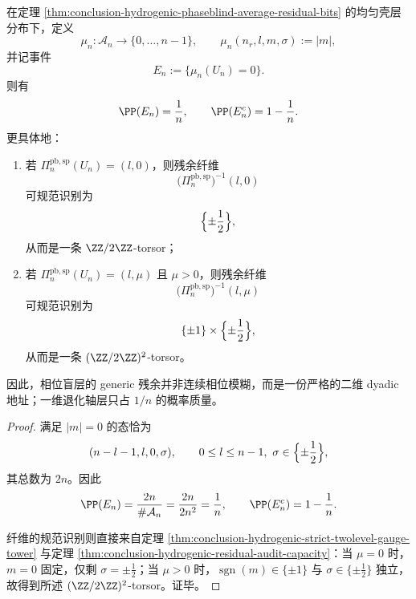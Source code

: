 \begin{theorem}\label{thm:conclusion-hydrogenic-generic-phaseblind-dyadic-torsor}
在定理 \ref{thm:conclusion-hydrogenic-phaseblind-average-residual-bits} 的均匀壳层分布下，定义
\[
\mu_n:\mathcal A_n\to \{0,\dots,n-1\},
\qquad
\mu_n(n_r,l,m,\sigma):=|m|,
\]
并记事件
\[
E_n:=\{\mu_n(U_n)=0\}.
\]
则有
\[
\PP(E_n)=\frac1n,
\qquad
\PP(E_n^c)=1-\frac1n.
\]
更具体地：
\begin{enumerate}
  \item 若 \(\Pi_n^{\mathrm{pb,sp}}(U_n)=(l,0)\)，则残余纤维
  \[
  \bigl(\Pi_n^{\mathrm{pb,sp}}\bigr)^{-1}(l,0)
  \]
  可规范识别为
  \[
  \Bigl\{\pm \frac12\Bigr\},
  \]
  从而是一条 \(\ZZ/2\ZZ\)-torsor；
  \item 若 \(\Pi_n^{\mathrm{pb,sp}}(U_n)=(l,\mu)\) 且 \(\mu>0\)，则残余纤维
  \[
  \bigl(\Pi_n^{\mathrm{pb,sp}}\bigr)^{-1}(l,\mu)
  \]
  可规范识别为
  \[
  \{\pm1\}\times \Bigl\{\pm\frac12\Bigr\},
  \]
  从而是一条 \((\ZZ/2\ZZ)^2\)-torsor。
\end{enumerate}
因此，相位盲层的 generic 残余并非连续相位模糊，而是一份严格的二维 dyadic 地址；一维退化轴层只占 \(1/n\) 的概率质量。
\end{theorem}
\begin{proof}
满足 \(|m|=0\) 的态恰为
\[
(n-l-1,l,0,\sigma),
\qquad
0\le l\le n-1,\ \sigma\in\Bigl\{\pm\frac12\Bigr\},
\]
其总数为 \(2n\)。因此
\[
\PP(E_n)=\frac{2n}{\#\mathcal A_n}=\frac{2n}{2n^2}=\frac1n,
\qquad
\PP(E_n^c)=1-\frac1n.
\]

纤维的规范识别则直接来自定理 \ref{thm:conclusion-hydrogenic-strict-twolevel-gauge-tower} 与定理 \ref{thm:conclusion-hydrogenic-residual-audit-capacity}：当 \(\mu=0\) 时，\(m=0\) 固定，仅剩 \(\sigma=\pm\tfrac12\)；当 \(\mu>0\) 时，\(\operatorname{sgn}(m)\in\{\pm1\}\) 与 \(\sigma\in\{\pm\tfrac12\}\) 独立，故得到所述 \((\ZZ/2\ZZ)^2\)-torsor。证毕。
\end{proof}

